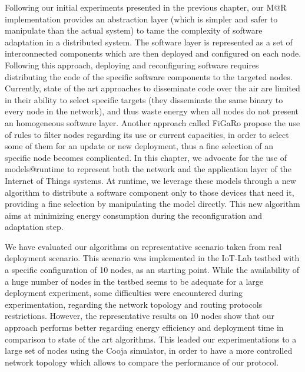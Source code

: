 Following our initial experiments presented in the previous chapter, our M@R implementation provides an abstraction layer (which is simpler and safer to manipulate than the actual system) to tame the complexity of software adaptation in a distributed system. 
The software layer is represented as a set of interconnected components which are then deployed and configured on each node.
Following this approach, deploying and reconfiguring software requires distributing the code of the specific software components to the targeted nodes.
Currently, state of the art approaches to disseminate code over the air are limited in their ability to select specific targets (they disseminate the same binary to every node in the network\cite{hui2004dynamic}), and thus waste energy when all nodes do not present an homogeneous software layer.
Another approach called FiGaRo\cite{mottola2008figaro} propose the use of rules to filter nodes regarding its use or current capacities, in order to select some of them for an update or new deployment, thus a fine selection of an specific node becomes complicated.
In this chapter, we advocate for the use of models@runtime to represent both the network and the application layer of the Internet of Things systems.
At runtime, we leverage these models through a new algorithm to distribute a software component only to those devices that need it, providing a fine selection by manipulating the model directly.
This new algorithm aims at minimizing energy consumption during the reconfiguration and adaptation step.

We have evaluated our algorithms on representative scenario taken from real deployment scenario.
This scenario was implemented in the IoT-Lab testbed \cite{Fleury15iotlab} with a specific configuration of 10 nodes, as an starting point.
While the availability of a huge number of nodes in the testbed seems to be adequate for a large deployment experiment, some difficulties were encountered during experimentation, regarding the network topology and routing protocols restrictions.
However, the representative results on 10 nodes show that our approach performs better regarding energy efficiency and deployment time in comparison to state of the art algorithms.
This leaded our experimentations to a large set of nodes using the Cooja\cite{osterlind2006cross} simulator, in order to have a more controlled network topology which allows to compare the performance of our protocol.

